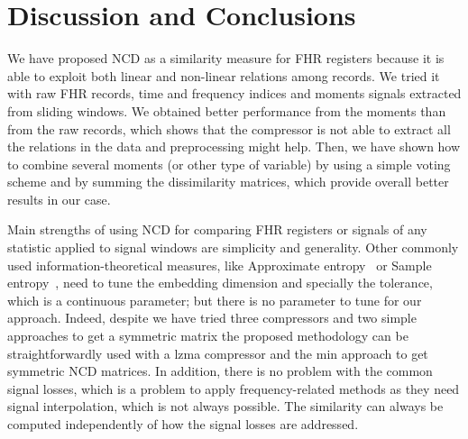 \section{Discussion and Conclusions}
\label{sec:discussion}


We have proposed NCD as a similarity measure for FHR registers because it is able to exploit both linear and non-linear relations among records. We tried it with raw FHR records, time and frequency indices and moments signals extracted from sliding windows. We obtained better performance from the moments than from the raw records, which shows that the compressor is not able to extract all the relations in the data and preprocessing might help. Then, we have shown how to combine several moments (or other type of variable) by using a simple voting scheme and by summing the dissimilarity matrices, which provide overall better results in our case.

Main strengths of using NCD for comparing FHR registers or signals of  any statistic applied to signal windows are simplicity and generality. Other commonly used information-theoretical measures, like Approximate entropy~\cite{Pincus1991} or Sample entropy~\cite{Richman2000}, need to tune the embedding dimension and specially the tolerance, which is a continuous parameter; but there is no parameter to tune for our approach. Indeed, despite we have tried three compressors and two simple approaches to get a symmetric matrix  the proposed methodology can be straightforwardly used with a lzma compressor and the min approach to get symmetric NCD matrices.  In addition, there is no problem with the common signal losses, which is a problem to apply frequency-related methods as they need signal interpolation, which is not always possible. The similarity can always be computed independently of how the signal losses are addressed. 


